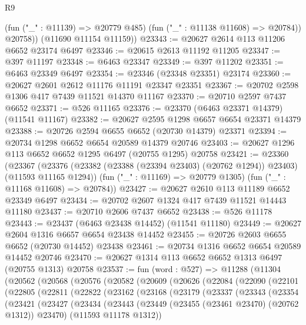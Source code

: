 \begin{lexlean}{R9}
\begin{coremodule}
{{{{{{{{{{{{{{{{{{{{{{{{{{{{{{{{{{{{{{{{{{{{{{{{{{{{{{{{{{{{{{{{{{{{{{{{{{{{{{{{{{{{            (fun ("_" : @11139) => @20779 @485)
            (fun ("_" : @11138 @11608) => @20784))
          @20758))
      (@11690 @11154 @11159))
@23343 := @20627 @2614 @113 @11206 @6652 @23174 @6497
@23346 := @20615 @2613 @11192 @11205
@23347 := @397 @11197
@23348 := @6463 @23347
@23349 := @397 @11202
@23351 := @6463 @23349 @6497
@23354 := @23346 (@23348 @23351) @23174
@23360 := @20627 @2601 @2612 @11176 @11191 @23347 @23351
@23367 := @20702 @2598 @1306 @417 @7439 @11521 @14370 @11167
@23370 := @20710 @2597 @7437 @6652
@23371 := @526 @11165
@23376 := @23370 (@6463 @23371 @14379) (@11541 @11167)
@23382 := @20627 @2595 @1298 @6657 @6654 @23371 @14379
@23388 := @20726 @2594 @6655 @6652 (@20730 @14379) @23371
@23394 := @20734 @1298 @6652 @6654 @20589 @14379 @20746
@23403 := @20627 @1296 @113 @6652 @6652 @1295 @6497 (@20755 @1295) @20758
@23421 := @23360
    (@23367
      (@23376 (@23382 (@23388 (@23394 @23403) (@20762 @1294)) @23403) (@11593 @11165 @1294))
      (fun ("_" : @11169) => @20779 @1305)
      (fun ("_" : @11168 @11608) => @20784))
@23427 := @20627 @2610 @113 @11189 @6652 @23349 @6497
@23434 := @20702 @2607 @1324 @417 @7439 @11521 @14443 @11180
@23437 := @20710 @2606 @7437 @6652
@23438 := @526 @11178
@23443 := @23437 (@6463 @23438 @14452) (@11541 @11180)
@23449 := @20627 @2604 @1316 @6657 @6654 @23438 @14452
@23455 := @20726 @2603 @6655 @6652 (@20730 @14452) @23438
@23461 := @20734 @1316 @6652 @6654 @20589 @14452 @20746
@23470 := @20627 @1314 @113 @6652 @6652 @1313 @6497 (@20755 @1313) @20758
@23537 := fun (word : @527) =>
  @11288
    (@11304
      (@20562
        (@20568
          (@20576
            (@20582
              (@20609
                (@20626
                  (@22084
                    (@22090
                      (@22101
                        (@22805
                          (@22811
                            (@22822
                              (@23162
                                (@23168
                                  (@23179
                                    (@23337
                                      (@23343
                                        (@23354
                                          (@23421
                                            (@23427
                                              (@23434
                                                (@23443
                                                  (@23449
                                                    (@23455 (@23461 @23470) (@20762 @1312))
                                                    @23470)
                                                  (@11593 @11178 @1312))
}}}}}}}}}}}}}}}}}}}}}}}}}}}}}}}}}}}}}}}}}}}}}}}}}}}}}}}}}}}}}}}}}}}}}}}}}}}}}}}}}}}}
\end{coremodule}
\end{lexlean}
